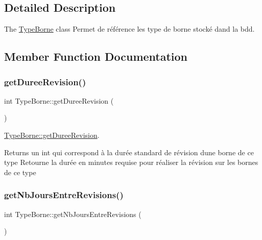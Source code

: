 \subsection{Detailed Description}
The \hyperlink{class_type_borne}{Type\+Borne} class Permet de référence les type de borne stocké dand la bdd. 

\subsection{Member Function Documentation}
\mbox{\label{class_type_borne_aee58fc4a65b54cf00376c72df39ac0d9}} 
\subsubsection{\texorpdfstring{get\+Duree\+Revision()}{getDureeRevision()}}
{\footnotesize\ttfamily int Type\+Borne\+::get\+Duree\+Revision (\begin{DoxyParamCaption}{ }\end{DoxyParamCaption})}



\hyperlink{class_type_borne_aee58fc4a65b54cf00376c72df39ac0d9}{Type\+Borne\+::get\+Duree\+Revision}. 

\begin{DoxyReturn}{Returns}
un int qui correspond à la durée standard de révision d\textquotesingle{}une borne de ce type Retourne la durée en minutes requise pour réaliser la révision sur les bornes de ce type 
\end{DoxyReturn}
\mbox{\label{class_type_borne_a4921b40e0c20ec1c98ea167cb787e605}} 
\subsubsection{\texorpdfstring{get\+Nb\+Jours\+Entre\+Revisions()}{getNbJoursEntreRevisions()}}
{\footnotesize\ttfamily int Type\+Borne\+::get\+Nb\+Jours\+Entre\+Revisions (\begin{DoxyParamCaption}{ }\end{DoxyParamCaption})}



